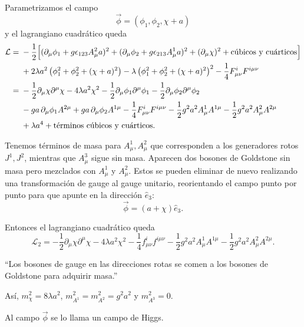 \documentclass[11pt,a4paper]{article}
\newcommand{\concept}[1]{\textcolor{concept-green}{#1}}
\begin{document}
Parametrizamos el campo
\[
  \vec\phi=(\phi_1,\phi_2,\chi+a)
\]
y el lagrangiano cuadrático queda
\begin{align*}
  \mathcal L={}&-\frac12\Bigl[
    (\partial_\mu\phi_1+g\epsilon_{123}A_\mu^2a)^2
    +(\partial_\mu\phi_2+g\epsilon_{213}A_\mu^1a)^2
    +(\partial_\mu\chi)^2
    +\text{cúbicos y cuárticos}
  \Bigr]\\
  &+2\lambda a^2\left(\phi_1^2+\phi_2^2+(\chi+a)^2\right)
   -\lambda\left(\phi_1^2+\phi_2^2+(\chi+a)^2\right)^2
   -\frac14F_{\mu\nu}^iF^{i\mu\nu}\\
  ={}&-\frac12\partial_\mu\chi\partial^\mu\chi
   -4\lambda a^2\chi^2
   -\frac12\partial_\mu\phi_1\partial^\mu\phi_1
   -\frac12\partial_\mu\phi_2\partial^\mu\phi_2\\
  &-ga\,\partial_\mu\phi_1A^{2\mu}
   +ga\,\partial_\mu\phi_2A^{1\mu}
   -\frac14F_{\mu\nu}^iF^{i\mu\nu}
   -\frac12g^2a^2A_\mu^1A^{1\mu}
   -\frac12g^2a^2A_\mu^2A^{2\mu}\\
  &+\lambda a^4+\text{términos cúbicos y cuárticos}.
\end{align*}

Tenemos términos de masa para $A_\mu^1,A_\mu^2$ que corresponden a los
generadores rotos $J^1,J^2$, mientras que $A_\mu^3$ sigue sin masa. Aparecen dos
bosones de Goldstone sin masa pero mezclados con $A_\mu^1$ y $A_\mu^2$. Estos se
pueden eliminar de nuevo realizando una transformación de gauge al gauge
unitario, reorientando el campo punto por punto para que apunte en la dirección
$\hat e_3$:
\[
  \vec\phi=(a+\chi)\hat e_3.
\]

Entonces el lagrangiano cuadrático queda
\[
  \mathcal L_2
  =-\frac12\partial_\mu\chi\partial^\mu\chi
   -4\lambda a^2\chi^2
   -\frac14f_{\mu\nu}^if^{i\mu\nu}
   -\frac12g^2a^2A_\mu^1A^{1\mu}
   -\frac12g^2a^2A_\mu^2A^{2\mu}.
\]

``Los bosones de gauge en las direcciones rotas se comen a los bosones de
Goldstone para adquirir masa.''

Así, $m_\chi^2=8\lambda a^2$,
$m_{A^1}^2=m_{A^2}^2=g^2a^2$ y $m_{A^3}^2=0$.

Al campo $\vec\phi$ se lo llama un \concept{campo de Higgs}.
\end{document}

